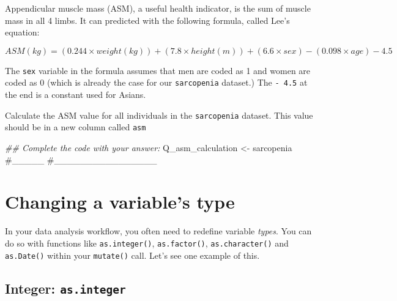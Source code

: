 \documentclass[
  letterpaper,
  DIV=11,
  numbers=noendperiod]{scrreprt}
\newenvironment{Shaded}{\begin{snugshade}}{\end{snugshade}}
\newcommand{\CommentTok}[1]{\textcolor[rgb]{0.37,0.37,0.37}{#1}}
\newcommand{\DocumentationTok}[1]{\textcolor[rgb]{0.37,0.37,0.37}{\textit{#1}}}
\newcommand{\NormalTok}[1]{\textcolor[rgb]{0.00,0.23,0.31}{#1}}
\newcommand{\OtherTok}[1]{\textcolor[rgb]{0.00,0.23,0.31}{#1}}
\begin{document}
\begin{tcolorbox}[enhanced jigsaw, title=\textcolor{quarto-callout-tip-color}{\faLightbulb}\hspace{0.5em}{Practice}, colbacktitle=quarto-callout-tip-color!10!white, leftrule=.75mm, arc=.35mm, opacityback=0, bottomrule=.15mm, rightrule=.15mm, toptitle=1mm, breakable, toprule=.15mm, colback=white, coltitle=black, colframe=quarto-callout-tip-color-frame, bottomtitle=1mm, titlerule=0mm, left=2mm, opacitybacktitle=0.6]

Appendicular muscle mass (ASM), a useful health indicator, is the sum of
muscle mass in all 4 limbs. It can predicted with the following formula,
called Lee's equation:

\[ASM(kg)= (0.244 \times weight(kg)) + (7.8 \times height(m)) + (6.6 \times sex) - (0.098 \times age) - 4.5\]

The \texttt{sex} variable in the formula assumes that men are coded as 1
and women are coded as 0 (which is already the case for our
\texttt{sarcopenia} dataset.) The \texttt{-\ 4.5} at the end is a
constant used for Asians.

Calculate the ASM value for all individuals in the \texttt{sarcopenia}
dataset. This value should be in a new column called \texttt{asm}

\begin{Shaded}
\begin{Highlighting}[]
\DocumentationTok{\#\# Complete the code with your answer:}
\NormalTok{Q\_asm\_calculation }\OtherTok{\textless{}{-}} 
\NormalTok{  sarcopenia }\CommentTok{\#\_\_\_\_\_}
  \CommentTok{\#\_\_\_\_\_\_\_\_\_\_\_\_\_\_\_\_}
\end{Highlighting}
\end{Shaded}

\end{tcolorbox}

\section{Changing a variable's type}\label{changing-a-variables-type}

In your data analysis workflow, you often need to redefine variable
\emph{types}. You can do so with functions like \texttt{as.integer()},
\texttt{as.factor()}, \texttt{as.character()} and \texttt{as.Date()}
within your \texttt{mutate()} call. Let's see one example of this.

\subsection{\texorpdfstring{Integer:
\texttt{as.integer}}{Integer: as.integer}}\label{integer-as.integer}
\end{document}
